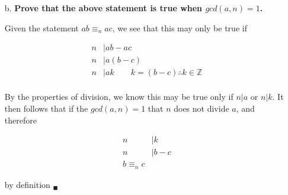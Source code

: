 \documentclass{article}
\begin{document}
\begin{enumerate}
\begin{enumerate}
				\item [b.]	\textbf{Prove that the above statement is true when $gcd(a, n) = 1$.}

					Given the statement $ab \equiv_n ac$, we see that this may only be true if 

						\begin{align*}
							n & | ab - ac \\
							n & | a(b - c) \\
							n & | ak \qquad k = (b - c) \therefore k \in \mathbb{Z} \\
						\end{align*}

					By the properties of division, we know this may be true only if $n | a$ or $n |
					k$. It then follows that if the $gcd(a, n) = 1$ that $n$ does not divide $a$, 
					and therefore

						\begin{align*}
							n & | k \\
							n & | b - c \\
							b \equiv_n c
						\end{align*}

					by definition $_{\blacksquare}$

			\end{enumerate}
	\end{enumerate}
\end{document}
